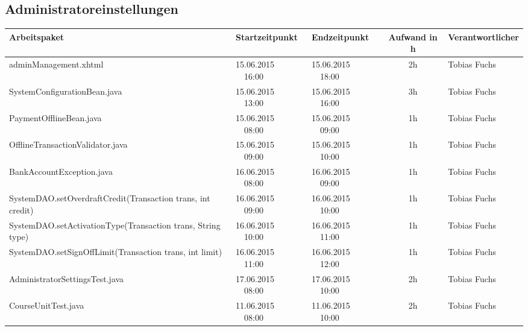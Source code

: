 \begin{landscape}
	\subsection{Administratoreinstellungen}
	\begin{tabular}{|p{10.3cm}|p{3.2cm}|p{3.2cm}|c|p{3.5cm}|}
		\hline  \textbf{Arbeitspaket} & \textbf{Startzeitpunkt} & \textbf{Endzeitpunkt} & \textbf{Aufwand in h} & \textbf{Verantwortlicher} \\ 
		\hline   adminManagement.xhtml                                 & 15.06.2015 \ \ 16:00       & 15.06.2015  \ \  18:00      &  2h                & Tobias Fuchs\\
		\hline   SystemConfigurationBean.java                          & 15.06.2015 \ \ 13:00       & 15.06.2015  \ \  16:00      &  3h                & Tobias Fuchs\\
		\hline   PaymentOfflineBean.java                               & 15.06.2015 \ \ 08:00       & 15.06.2015  \ \  09:00      &  1h                & Tobias Fuchs\\
		\hline   OfflineTransactionValidator.java                      & 15.06.2015 \ \ 09:00       & 15.06.2015  \ \  10:00      &  1h                & Tobias Fuchs\\
		\hline   BankAccountException.java                             & 16.06.2015 \ \ 08:00       & 16.06.2015  \ \  09:00      &  1h                & Tobias Fuchs\\
		\hline   SystemDAO.setOverdraftCredit(Transaction trans, int credit)  & 16.06.2015 \ \ 09:00       & 16.06.2015  \ \  10:00      &  1h                & Tobias Fuchs\\
		\hline   SystemDAO.setActivationType(Transaction trans, String type)  & 16.06.2015 \ \ 10:00       & 16.06.2015  \ \  11:00      &  1h                & Tobias Fuchs\\
		\hline   SystemDAO.setSignOffLimit(Transaction trans, int limit)      & 16.06.2015 \ \ 11:00       & 16.06.2015  \ \  12:00      &  1h                & Tobias Fuchs\\
		\hline   AdministratorSettingsTest.java     & 17.06.2015 \ \ 08:00       & 17.06.2015  \ \  10:00      &  2h                & Tobias Fuchs\\
		\hline   CourseUnitTest.java& 11.06.2015 \ \ 08:00       & 11.06.2015  \ \  10:00       &   2h     &  Tobias Fuchs\\
		\hline 
	\end{tabular} \ \\
	\ \\
	

\end{landscape}
